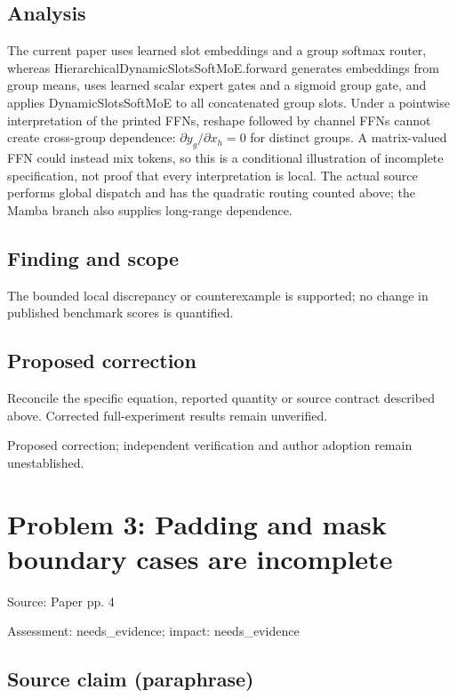 \documentclass[11pt]{article}
\begin{document}
\subsection*{Analysis}

The current paper uses learned slot embeddings and a group softmax router, whereas HierarchicalDynamicSlotsSoftMoE.forward generates embeddings from group means, uses learned scalar expert gates and a sigmoid group gate, and applies DynamicSlotsSoftMoE to all concatenated group slots. Under a pointwise interpretation of the printed FFNs, reshape followed by channel FFNs cannot create cross-group dependence: \(\partial y_g/\partial x_h=0\) for distinct groups. A matrix-valued FFN could instead mix tokens, so this is a conditional illustration of incomplete specification, not proof that every interpretation is local. The actual source performs global dispatch and has the quadratic routing counted above; the Mamba branch also supplies long-range dependence.

\subsection*{Finding and scope}

The bounded local discrepancy or counterexample is supported; no change in published benchmark scores is quantified.

\subsection*{Proposed correction}

Reconcile the specific equation, reported quantity or source contract described above. Corrected full-experiment results remain unverified.

Proposed correction; independent verification and author adoption remain unestablished.

\section*{Problem 3: Padding and mask boundary cases are incomplete}

Source: Paper pp. 4

Assessment: needs\_evidence; impact: needs\_evidence

\subsection*{Source claim (paraphrase)}
\end{document}
